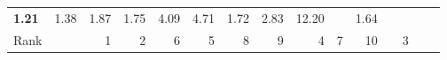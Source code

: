 \begin{tabular}{ll|rrrrrr|rrrrrrr}
  


  
  \textbf{1.21} & 1.38 & 1.87 & 1.75 & 4.09 & 4.71 & 1.72 & 2.83 & 12.20 &  & 1.64 \\

  Rank & &
  1 & 2 & 6 & 5 & 8 & 9 & 4 & 7 & 10 &  & 3 \\\hline\hline
  

\end{tabular}
